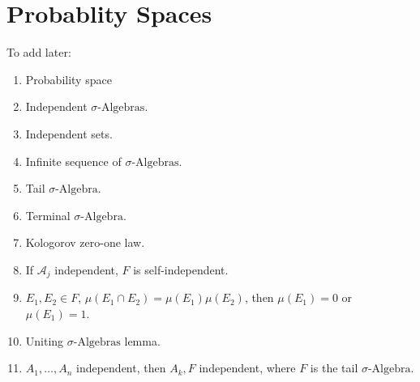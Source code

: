\section{Probablity Spaces}
    To add later:
    \begin{enumerate}
        \item Probability space
        \item Independent $\sigma\textrm{-Algebras}$.
        \item Independent sets.
        \item Infinite sequence of $\sigma\textrm{-Algebras}$.
        \item Tail $\sigma\textrm{-Algebra}$.
        \item Terminal $\sigma\textrm{-Algebra}$.
        \item Kologorov zero-one law.
        \item If $\mathcal{A}_{j}$ independent, $F$ is self-independent.
        \item $E_{1},E_{2}\in{F}$,
              $\mu(E_{1}\cap{E}_{2})=\mu(E_{1})\mu(E_{2})$, then
              $\mu(E_{1})=0$ or $\mu(E_{1})=1$.
        \item Uniting $\sigma\textrm{-Algebras}$ lemma.
        \item $A_{1},\dots,A_{n}$ independent, then $A_{k},F$ independent,
              where $F$ is the tail $\sigma\textrm{-Algebra}$.
    \end{enumerate}